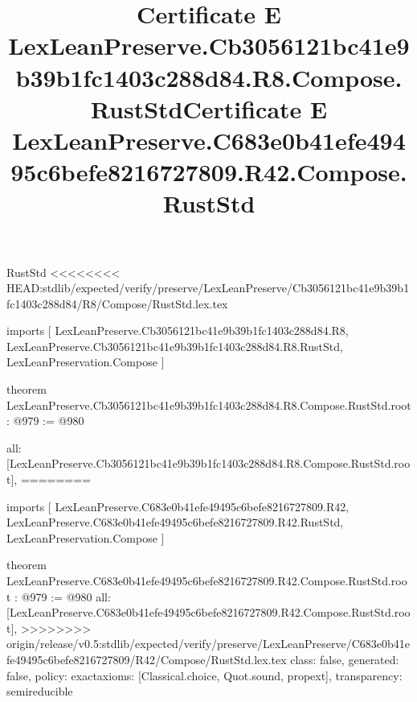 \begin{lexlean}{RustStd}
<<<<<<<< HEAD:stdlib/expected/verify/preserve/LexLeanPreserve/Cb3056121bc41e9b39b1fc1403c288d84/R8/Compose/RustStd.lex.tex
\title{Certificate E LexLeanPreserve.Cb3056121bc41e9b39b1fc1403c288d84.R8.Compose.RustStd}
\begin{coremodule}
imports [
  LexLeanPreserve.Cb3056121bc41e9b39b1fc1403c288d84.R8,
  LexLeanPreserve.Cb3056121bc41e9b39b1fc1403c288d84.R8.RustStd,
  LexLeanPreservation.Compose
]

theorem LexLeanPreserve.Cb3056121bc41e9b39b1fc1403c288d84.R8.Compose.RustStd.root : @979 := @980 {
  all: [LexLeanPreserve.Cb3056121bc41e9b39b1fc1403c288d84.R8.Compose.RustStd.root],
========
\title{Certificate E LexLeanPreserve.C683e0b41efe49495c6befe8216727809.R42.Compose.RustStd}
\begin{coremodule}
imports [
  LexLeanPreserve.C683e0b41efe49495c6befe8216727809.R42,
  LexLeanPreserve.C683e0b41efe49495c6befe8216727809.R42.RustStd,
  LexLeanPreservation.Compose
]

theorem LexLeanPreserve.C683e0b41efe49495c6befe8216727809.R42.Compose.RustStd.root : @979 := @980 {
  all: [LexLeanPreserve.C683e0b41efe49495c6befe8216727809.R42.Compose.RustStd.root],
>>>>>>>> origin/release/v0.5:stdlib/expected/verify/preserve/LexLeanPreserve/C683e0b41efe49495c6befe8216727809/R42/Compose/RustStd.lex.tex
  class: false,
  generated: false,
  policy: exact{axioms: [Classical.choice, Quot.sound, propext]},
  transparency: semireducible
}


\end{coremodule}}
\end{coremodule}
\end{lexlean}
